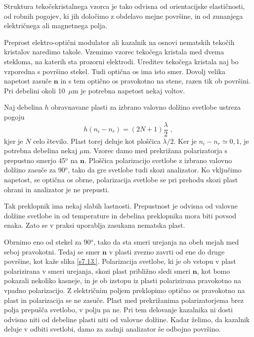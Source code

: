 Struktura tekočekristalnega vzorca je tako odvisna od orientacijske
elastičnosti, od robnih pogojev, ki jih določimo z obdelavo mejne
površine, in od zunanjega električnega ali magnetnega polja.

Preprost elektro-optični modulator ali kazalnik na osnovi nematskih
tekočih kristalov naredimo takole. Vzemimo vzorec tekočega kristala
med dvema stekloma, na katerih sta prozorni elektrodi. Ureditev tekočega
kristala naj bo vzporedna s površino stekel. Tudi optična os ima isto
smer. Dovolj velika napetost zasuče $\mathbf{n}$ in s tem optično os
pravokotno na stene, razen tik ob površini. Pri debelini okoli 10~$\mu$m
je potrebna napetost nekaj voltov.

Naj debelina $h$ obravnavane plasti za izbrano valovno dolžino svetlobe
ustreza pogoju 
\begin{equation}
h(n_{i}-n_{r})=(2N+1)\frac{\lambda}{2}\;,\label{7.57}
\end{equation}
 kjer je $N$ celo število. Plast torej deluje kot ploščica $\lambda/2$.
Ker je $n_{i}-n_{r}\simeq0,1$, je potrebna debelina nekaj $\mu$m.
Vzorec damo med prekrižana polarizatorja s prepustno smerjo 45$^{o}$
na $\mathbf{n}$. Ploščica polarizacijo svetlobe z izbrano valovno dolžino
zasuče za 90$^{o}$, tako da gre svetlobe tudi skozi analizator. Ko
vključimo napetost, se optična os obrne, polarizacija svetlobe se
pri prehodu skozi plast ohrani in analizator je ne prepusti.

Tak preklopnik ima nekaj slabih lastnosti. Prepustnost je odvisna
od valovne dolžine svetlobe in od temperature in debelina preklopnika
mora biti povsod enaka. Zato se v praksi uporablja zasukana nematska
plast.

Obrnimo eno od stekel za 90$^{o}$, tako da sta smeri urejanja na
obeh mejah med seboj pravokotni. Tedaj se smer $\mathbf{n}$ v plasti
zvezno zavrti od ene do druge površine, kot kaže slika \ref{s7.13.}.
Polarizacija svetlobe, ki je ob vstopu v plast polarizirana v smeri
urejanja, skozi plast približno sledi smeri $\mathbf{n}$, kot bomo pokazali
nekoliko kasneje, in je ob izstopu iz plasti polarizirana pravokotno
na vpadno polarizacijo. Z električnim poljem preklopimo optično os
pravokotno na plast in polarizacija se ne zasuče. Plast med prekrižanima
polarizatorjema brez polja prepušča svetlobo, v polju pa ne. Pri tem
delovanje kazalnika ni dosti odvisno niti od debeline plasti niti
od valovne dolžine. Kadar želimo, da kazalnik deluje v odbiti svetlobi,
damo za zadnji analizator še odbojno površino.

